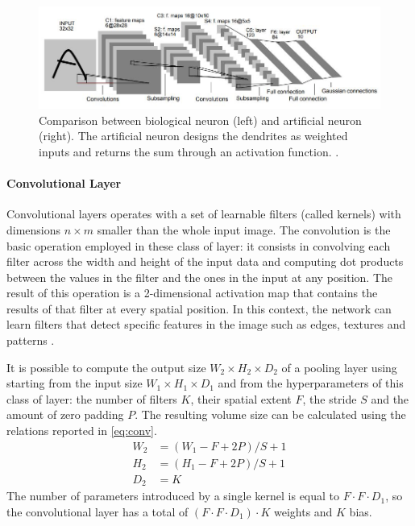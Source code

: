 \begin{figure}[!h]
	\centering
	\includegraphics[width=\textwidth]{img/lenet5.jpg}

	\caption{\small Comparison between biological neuron (left) and artificial neuron (right). The artificial neuron designs the dendrites as weighted inputs and returns the sum through an activation function. \cite{stanford2019cs231n}.}
	\label{fig:lenet5}
\end{figure}

\paragraph{Convolutional Layer}

Convolutional layers \cite{lecun1995convolutional} operates with a set of learnable filters (called kernels) with dimensions $n \times m$ smaller than the whole input image. The convolution is the basic operation employed in these class of layer: it consists in convolving each filter across the width and height of the input data and computing dot products between the values in the filter and the ones in the input at any position. The result of this operation is a 2-dimensional activation map that contains the results of that filter at every spatial position.  In this context, the network can learn filters that detect specific features in the image such as edges, textures and patterns \cite{erhan2009visualizing}.

It is possible to compute the output size $W_2 \times H_2 \times D_2$ of a pooling layer using starting from the input size $W_1 \times H_1 \times D_1$ and from the hyperparameters of this class of layer: the number of filters $K$, their spatial extent $F$, the stride $S$ and the amount of zero padding $P$. The resulting volume size can be calculated using the relations reported in \vref{eq:conv}.
\begin{equation} \label{eq:conv}
\begin{aligned}
W_2 &= (W_1 - F + 2P)/S + 1\\
H_2 &= (H_1 - F + 2P)/S + 1\\
D_2 &= K
\end{aligned}
\end{equation}
The number of parameters introduced by a single kernel is equal to $F \cdot F \cdot D_1$, so the convolutional layer has a total of $(F \cdot F \cdot D_1) \cdot K$ weights and $K$ bias.

